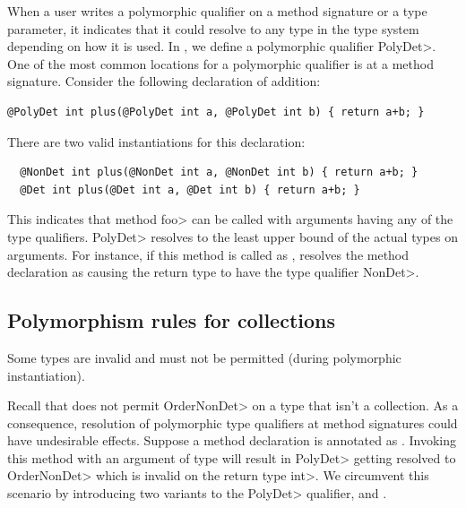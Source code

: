 When a user writes a polymorphic qualifier on a method signature or a type parameter,
it indicates that it could resolve to any type in the type system depending on how it is used.
In \theDeterminismChecker, we define a polymorphic qualifier \<PolyDet>.
One of the most common locations for a polymorphic qualifier is at a method signature.
Consider the following declaration of addition:
\begin{verbatim}
@PolyDet int plus(@PolyDet int a, @PolyDet int b) { return a+b; }
\end{verbatim}
There are two valid instantiations for this declaration:
\begin{Verbatim}
  @NonDet int plus(@NonDet int a, @NonDet int b) { return a+b; }
  @Det int plus(@Det int a, @Det int b) { return a+b; }
\end{Verbatim}
This indicates that method \<foo> can be called with arguments having any of the  type qualifiers.
 \<PolyDet> resolves to the least upper bound of
the actual types on arguments. For instance, if this method is called as , \theDeterminismChecker resolves the method declaration as 
causing the return type to have the type qualifier \<NonDet>.

\subsection{Polymorphism rules for collections}\label{polymorphism-up-down}

Some types are invalid and must not be permitted (during polymorphic instantiation).

Recall that \theDeterminismChecker does not permit \<OrderNonDet> on a type
that isn't a collection.
As a consequence, resolution of polymorphic type qualifiers at method signatures could have undesirable effects.
Suppose a method declaration is annotated as . Invoking this method
with an argument of type  will result in \<PolyDet> getting resolved to \<OrderNonDet> which is invalid
on the return type \<int>. We circumvent this scenario by introducing two variants to the \<PolyDet> qualifier, \PolyDetUp
and \PolyDetDown. 

